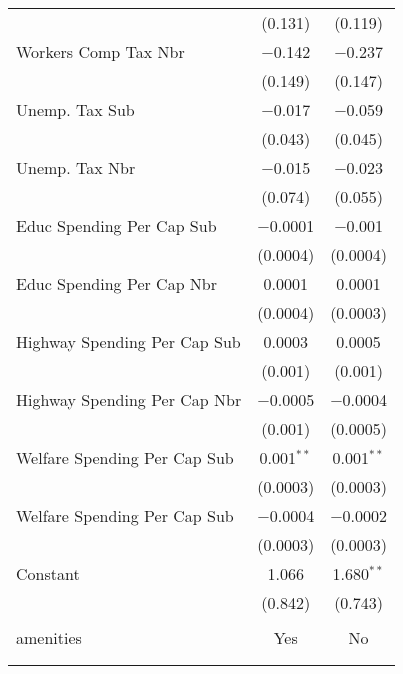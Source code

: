 \begin{table}[!htbp]
\begin{tabular}{@{\extracolsep{5pt}}lcc}
  & (0.131) & (0.119) \\ 
  Workers Comp Tax Nbr & $-$0.142 & $-$0.237 \\ 
  & (0.149) & (0.147) \\ 
  Unemp. Tax Sub & $-$0.017 & $-$0.059 \\ 
  & (0.043) & (0.045) \\ 
  Unemp. Tax Nbr & $-$0.015 & $-$0.023 \\ 
  & (0.074) & (0.055) \\ 
  Educ Spending Per Cap Sub & $-$0.0001 & $-$0.001 \\ 
  & (0.0004) & (0.0004) \\ 
  Educ Spending Per Cap Nbr & 0.0001 & 0.0001 \\ 
  & (0.0004) & (0.0003) \\ 
  Highway Spending Per Cap Sub & 0.0003 & 0.0005 \\ 
  & (0.001) & (0.001) \\ 
  Highway Spending Per Cap Nbr & $-$0.0005 & $-$0.0004 \\ 
  & (0.001) & (0.0005) \\ 
  Welfare Spending Per Cap Sub & 0.001$^{**}$ & 0.001$^{**}$ \\ 
  & (0.0003) & (0.0003) \\ 
  Welfare Spending Per Cap Sub & $-$0.0004 & $-$0.0002 \\ 
  & (0.0003) & (0.0003) \\ 
  Constant & 1.066 & 1.680$^{**}$ \\ 
  & (0.842) & (0.743) \\ 
 \hline \\[-1.8ex] 
amenities & Yes & No \\ 
\hline \\[-1.8ex] 
\hline 
\hline \\[-1.8ex] 
\end{tabular} 
\end{table} 

